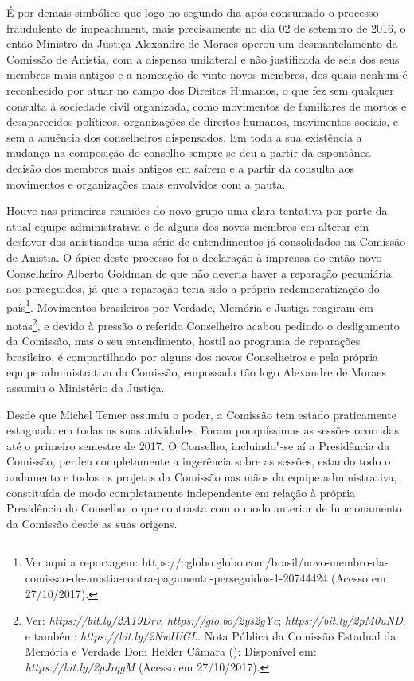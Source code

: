 É por demais simbólico que logo no segundo dia após consumado o processo
fraudulento de impeachment, mais precisamente no dia 02 de setembro de
2016, o então Ministro da Justiça Alexandre de Moraes operou um
desmantelamento da Comissão de Anistia, com a dispensa unilateral e não
justificada de seis dos seus membros mais antigos e a nomeação de vinte
novos membros, dos quais nenhum é reconhecido por atuar no campo dos
Direitos Humanos, o que fez sem qualquer consulta à sociedade civil
organizada, como movimentos de familiares de mortos e desaparecidos
políticos, organizações de direitos humanos, movimentos sociais, e sem a
anuência dos conselheiros dispensados. Em toda a sua existência a
mudança na composição do conselho sempre se deu a partir da espontânea
decisão dos membros mais antigos em saírem e a partir da consulta aos
movimentos e organizações mais envolvidos com a pauta.

Houve nas primeiras reuniões do novo grupo uma clara tentativa por parte
da atual equipe administrativa e de alguns dos novos membros em alterar
em desfavor dos anistiandos uma série de entendimentos já consolidados
na Comissão de Anistia. O ápice deste processo foi a declaração à
imprensa do então novo Conselheiro Alberto Goldman de que não deveria
haver a reparação pecuniária aos perseguidos, já que a reparação teria
sido a própria redemocratização do país\footnote{Ver aqui a reportagem:
  https://oglobo.globo.com/brasil/novo-membro-da-comissao-de-anistia-contra-pagamento-perseguidos-1-20744424
  (Acesso em 27/10/2017).}. Movimentos brasileiros por Verdade, Memória
e Justiça reagiram em notas\footnote{Ver:
  \emph{https://bit.ly/2A19Drv};
  \emph{https://glo.bo/2ys2gYc};
  \emph{https://bit.ly/2pM0uND};
  e também:
  \emph{https://bit.ly/2NwIUGL}.
  Nota Pública da Comissão Estadual da Memória e Verdade Dom Helder
  Câmara (): Disponível em: \emph{https://bit.ly/2pJrqgM}
  (Acesso em 27/10/2017).}, e devido à pressão o referido Conselheiro
acabou pedindo o desligamento da Comissão, mas o seu entendimento,
hostil ao programa de reparações brasileiro, é compartilhado por alguns
dos novos Conselheiros e pela própria equipe administrativa da Comissão,
empossada tão logo Alexandre de Moraes assumiu o Ministério da Justiça.

Desde que Michel Temer assumiu o poder, a Comissão tem estado
praticamente estagnada em todas as suas atividades. Foram pouquíssimas
as sessões ocorridas até o primeiro semestre de 2017. O Conselho,
incluindo"-se aí a Presidência da Comissão, perdeu completamente a
ingerência sobre as sessões, estando todo o andamento e todos os
projetos da Comissão nas mãos da equipe administrativa, constituída de
modo completamente independente em relação à própria Presidência do
Conselho, o que contrasta com o modo anterior de funcionamento da
Comissão desde as suas origens.

